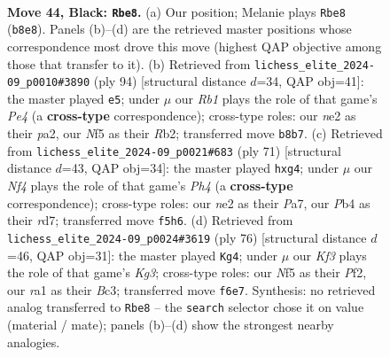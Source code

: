 \documentclass[11pt]{article}
\begin{document}
\clearpage

\begin{figure}[p]\centering
\begin{subfigure}{0.46\textwidth}\centering
\resizebox{\linewidth}{!}{%
\newchessgame
\chessboard[
  setfen={1r6/8/R2p1kp1/5n1p/1p2r2P/8/4NKP1/R7 b - - 0 44},
  showmover=false,
  pgfstyle=straightmove, color=movearrow, markmove={b8-e8}
]}
\caption{}
\end{subfigure}\hfill
\begin{subfigure}{0.46\textwidth}\centering
\resizebox{\linewidth}{!}{%
\newchessgame
\chessboard[
  setfen={r7/6pk/8/1n5p/rPN1P3/4K1P1/pR5P/R7 w - - 3 48},
  showmover=false,
  pgfstyle=straightmove, color=movearrow, markmove={e4-e5}
]}
\caption{}
\end{subfigure}
\\[4pt]
\begin{subfigure}{0.46\textwidth}\centering
\resizebox{\linewidth}{!}{%
\newchessgame
\chessboard[
  setfen={8/pR1R4/2r2pk1/6pp/6P1/7P/r4PK1/8 b - - 0 36},
  showmover=false,
  pgfstyle=straightmove, color=movearrow, markmove={h5-g4}
]}
\caption{}
\end{subfigure}\hfill
\begin{subfigure}{0.46\textwidth}\centering
\resizebox{\linewidth}{!}{%
\newchessgame
\chessboard[
  setfen={5r2/3kp1R1/3p4/5rN1/p7/P1B2PK1/1P3P2/8 w - - 5 39},
  showmover=false,
  pgfstyle=straightmove, color=movearrow, markmove={g3-g4}
]}
\caption{}
\end{subfigure}
\caption{\textbf{Move 44, Black: \texttt{Rbe8}.} (a) Our position; Melanie plays \texttt{Rbe8} (\texttt{b8e8}). Panels (b)--(d) are the retrieved master positions whose correspondence most drove this move (highest QAP objective among those that transfer to it). (b) Retrieved from \texttt{lichess\_elite\_2024-09\_p0010\#3890} (ply 94) [structural distance $d$=34, QAP obj=41]: the master played \texttt{e5}; under $\mu$ our \emph{Rb1} plays the role of that game's \emph{Pe4} (a \textbf{cross-type} correspondence); cross-type roles: our \emph{n}e2 as their \emph{p}a2, our \emph{N}f5 as their \emph{R}b2; transferred move \texttt{b8b7}. (c) Retrieved from \texttt{lichess\_elite\_2024-09\_p0021\#683} (ply 71) [structural distance $d$=43, QAP obj=34]: the master played \texttt{hxg4}; under $\mu$ our \emph{Nf4} plays the role of that game's \emph{Ph4} (a \textbf{cross-type} correspondence); cross-type roles: our \emph{n}e2 as their \emph{P}a7, our \emph{P}b4 as their \emph{r}d7; transferred move \texttt{f5h6}. (d) Retrieved from \texttt{lichess\_elite\_2024-09\_p0024\#3619} (ply 76) [structural distance $d$=46, QAP obj=31]: the master played \texttt{Kg4}; under $\mu$ our \emph{Kf3} plays the role of that game's \emph{Kg3}; cross-type roles: our \emph{N}f5 as their \emph{P}f2, our \emph{r}a1 as their \emph{B}c3; transferred move \texttt{f6e7}. Synthesis: no retrieved analog transferred to \texttt{Rbe8} -- the \texttt{search} selector chose it on value (material / mate); panels (b)--(d) show the strongest nearby analogies.}
\label{fig:thought-m87}
\end{figure}
\end{document}
